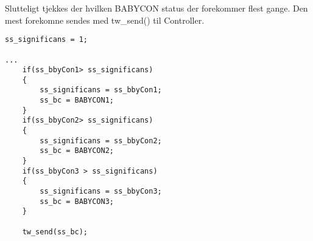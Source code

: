 Slutteligt tjekkes der hvilken BABYCON status der forekommer flest gange. Den mest forekomne sendes med tw\_send() til Controller. 
\begin{verbatim}
ss_significans = 1;

...
	if(ss_bbyCon1> ss_significans)
	{
		ss_significans = ss_bbyCon1;
		ss_bc = BABYCON1;
	}
	if(ss_bbyCon2> ss_significans)
	{
		ss_significans = ss_bbyCon2;
		ss_bc = BABYCON2;
	}
	if(ss_bbyCon3 > ss_significans)
	{
		ss_significans = ss_bbyCon3;
		ss_bc = BABYCON3;
	}

	tw_send(ss_bc);
\end{verbatim}
